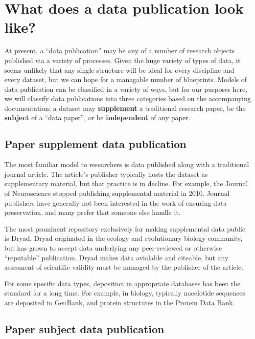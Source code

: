 \documentclass[10pt,a4paper,twocolumn]{article}
\begin{document}
\section*{What does a data publication look like?}\label{what-does-a-data-publication-look-like}

At present, a ``data publication'' may be any of a number of research objects published via a variety of processes.
Given the huge variety of types of data, it seems unlikely that any single structure will be ideal for every discipline and every dataset, but we can hope for a managable number of blueprints. 
Models of data publication can be classified in a variety of ways, but for our purposes here, we will classify data publications into three categories based on the accompanying documentation; a dataset may \textbf{supplement} a traditional research paper, be the \textbf{subject} of a ``data paper'', or be \textbf{independent} of any paper.

\subsection*{Paper supplement data publication}\label{paper-supplement-data-publications}

The most familiar model to researchers is data published along with a traditional journal article. 
The article's publisher typically hosts the dataset as supplementary material, but that practice is in decline.
For example, the Journal of Neuroscience stopped publishing supplemental material in 2010\cite{maunsell_announcement_2010}. 
Journal publishers have generally not been interested in the work of ensuring data preservation, and many prefer that someone else handle it.

The most prominent repository exclusively for making supplemental data public is Dryad\cite{dryad}.
Dryad originated in the ecology and evolutionary biology community, but has grown to accept data underlying any peer-reviewed or otherwise ``reputable'' publication. Dryad makes data avialable and citeable, but any assesment of scientific validity must be managed by the publisher of the article. 

For some specific data types, deposition in appropriate databases has been the standard for a long time. 
For example, in biology, typically nucelotide sequences are deposited in GenBank\cite{genbank}, and protein structures in the Protein Data Bank\cite{protein_data_bank}.

\subsection*{Paper subject data publication}\label{paper-subject-data-publications}
\end{document}
